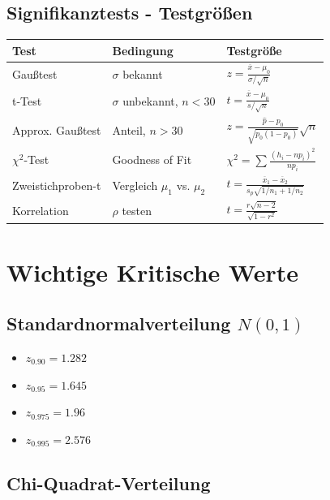 \documentclass[12pt, a4paper, titlepage, ngerman]{scrartcl}
\begin{document}
\subsection{Signifikanztests - Testgrößen}

\begin{table}[h]
  \centering
  \begin{tabular}{lll}
    \toprule
    \textbf{Test} & \textbf{Bedingung} & \textbf{Testgröße} \\
    \midrule
    Gaußtest & $\sigma$ bekannt & $z = \frac{\overline{x} - \mu_0}{\sigma/\sqrt{n}}$ \\
    t-Test & $\sigma$ unbekannt, $n < 30$ & $t = \frac{\overline{x} - \mu_0}{s/\sqrt{n}}$ \\
    Approx. Gaußtest & Anteil, $n > 30$ & $z = \frac{\hat{p} - p_0}{\sqrt{p_0(1-p_0)}} \sqrt{n}$ \\
    $\chi^2$-Test & Goodness of Fit & $\chi^2 = \sum \frac{(h_i - np_i)^2}{np_i}$ \\
    Zweistichproben-t & Vergleich $\mu_1$ vs. $\mu_2$ & $t = \frac{\overline{x}_1 - \overline{x}_2}{s_p\sqrt{1/n_1 + 1/n_2}}$ \\
    Korrelation & $\rho$ testen & $t = \frac{r\sqrt{n-2}}{\sqrt{1-r^2}}$ \\
    \bottomrule
  \end{tabular}
\end{table}

\section{Wichtige Kritische Werte}

\subsection{Standardnormalverteilung $N(0,1)$}

\begin{itemize}
  \item $z_{0.90} = 1.282$
  \item $z_{0.95} = 1.645$
  \item $z_{0.975} = 1.96$
  \item $z_{0.995} = 2.576$
\end{itemize}

\subsection{Chi-Quadrat-Verteilung}
\end{document}
